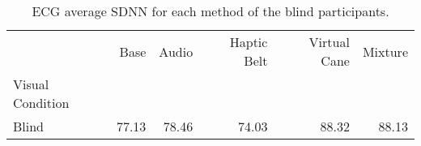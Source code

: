 
\begin{table}[!htb]
\centering
\caption{ECG average SDNN for each method of the blind participants.}
\label{tab:sdnn_average_group_blind}
\begin{tabular}{lrrrrr}
\toprule
{} &   Base &  Audio & Haptic Belt & Virtual Cane & Mixture \\
Visual Condition &        &        &             &              &         \\
\midrule
Blind            &  77.13 &  78.46 &       74.03 &        88.32 &   88.13 \\
\bottomrule
\end{tabular}
\end{table}

